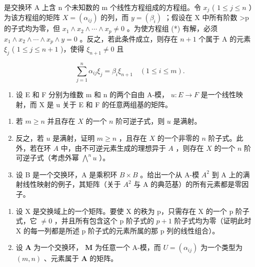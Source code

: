 是交换环 A 上含 n 个未知数的 m 个线性方程组成的方程组。令 \(x_{j}\) ( \(1 \leqslant j \leqslant n\) ）为该方程组的矩阵 \(X = (\alpha_{ij})\) 的列，而 \(y = (\beta_{i})\) ；假设在 X 中所有阶数 \textgreater p 的子式均为零，但 \(x_{1} \wedge x_{2} \wedge \cdots \wedge x_{p} \neq 0\) 。为使方程组 (*) 有解，必须 \(x_{1} \wedge x_{2} \wedge \cdots \wedge x_{p} \wedge y = 0\) 。反之，若此条件成立，则存在 \(n + 1\) 个属于 A 的元素 \(\xi_{j}\) ( \(1 \leqslant j \leqslant n + 1\) )，使得 \(\xi_{n+1} \neq 0\) 且

\[
\sum_ {j = 1} ^ {n} \alpha_ {i j} \xi_ {j} = \beta_ {i} \xi_ {n + 1} \quad (1 \leqslant i \leqslant m).
\]

\begin{enumerate}
\def\labelenumi{\arabic{enumi}.}
\setcounter{enumi}{17}
\tightlist
\item
  设 E 和 F 分别为维数 m 和 n 的两个自由 A-模， \(u:E \rightarrow F\) 是一个线性映射，而 X 是 u 关于 E 和 F 的任意两组基的矩阵。
\end{enumerate}

\begin{enumerate}
\def\labelenumi{(\alph{enumi})}
\item
  若 \(m \geqslant n\) 并且存在 \(X\) 的一个 \(n\) 阶可逆子式，则 \(u\) 是满射。
\item
  反之，若 \(u\) 是满射，证明 \(m \geqslant n\) ，且存在 \(X\) 的一个非零的 \(n\) 阶子式。此外，若在环 \(A\) 中，由不可逆元素生成的理想异于 \(A\) ，则存在 \(X\) 的一个 \(n\) 阶可逆子式（考虑外幂 \(\bigwedge^{n}u\) ）。
\item
  设 B 是一个交换环，A 是乘积环 \(B \times B\) 。给出一个从 A-模 \(A^{2}\) 到 A 上的满射线性映射的例子，其矩阵（关于 \(A^{2}\) 与 A 的典范基）的所有元素都是零因子。
\end{enumerate}

\begin{enumerate}
\def\labelenumi{\arabic{enumi}.}
\setcounter{enumi}{18}
\item
  设 X 是交换域上的一个矩阵。要使 X 的秩为 p，只需存在 X 的一个 p 阶子式，它 \(\neq0\) ，并且所有包含这个 p 阶子式的 \(p+1\) 阶子式均为零（证明此时 X 的每一列都是所述 p 阶子式的元素所属的那 p 列的线性组合）。
\item
  设 \(\mathbf{A}\) 为一个交换环， \(\mathbf{M}\) 为任意一个 A-模，而 \(U = (\alpha_{ij})\) 为一个类型为 \((m, n)\) 、元素属于 \(\mathbf{A}\) 的矩阵。
\end{enumerate}

